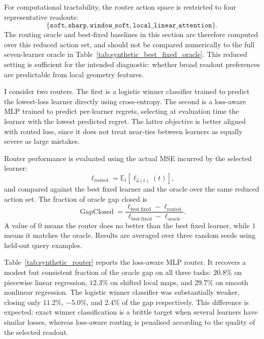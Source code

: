 For computational tractability, the router action space is restricted to four representative readouts:
\[
\{\texttt{soft},\texttt{sharp},\texttt{window\_soft},\texttt{local\_linear\_attention}\}.
\]
The routing oracle and best-fixed baselines in this section are therefore computed over this reduced action set, and should not be compared numerically to the full seven-learner oracle in Table~\ref{tab:synthetic_best_fixed_oracle}. This reduced setting is sufficient for the intended diagnostic: whether broad readout preferences are predictable from local geometry features.

I consider two routers. The first is a logistic winner classifier trained to predict the lowest-loss learner directly using cross-entropy. The second is a loss-aware MLP trained to predict per-learner regrets, selecting at evaluation time the learner with the lowest predicted regret. The latter objective is better aligned with routed loss, since it does not treat near-ties between learners as equally severe as large mistakes.

Router performance is evaluated using the actual MSE incurred by the selected learner:
\[
\ell_{\mathrm{routed}}
=
\mathbb{E}_{t}\left[\ell_{\hat a(t)}(t)\right],
\]
and compared against the best fixed learner and the oracle over the same reduced action set. The fraction of oracle gap closed is
\[
\operatorname{GapClosed}
=
\frac{
\ell_{\mathrm{best\ fixed}} - \ell_{\mathrm{routed}}
}{
\ell_{\mathrm{best\ fixed}} - \ell_{\mathrm{oracle}}
}.
\]
A value of \(0\) means the router does no better than the best fixed learner, while \(1\) means it matches the oracle. Results are averaged over three random seeds using held-out query examples.

Table~\ref{tab:synthetic_router} reports the loss-aware MLP router. It recovers a modest but consistent fraction of the oracle gap on all three tasks: \(20.8\%\) on piecewise linear regression, \(12.3\%\) on shifted local maps, and \(29.7\%\) on smooth nonlinear regression. The logistic winner classifier was substantially weaker, closing only \(11.2\%\), \(-5.0\%\), and \(2.4\%\) of the gap respectively. This difference is expected: exact winner classification is a brittle target when several learners have similar losses, whereas loss-aware routing is penalised according to the quality of the selected readout.

